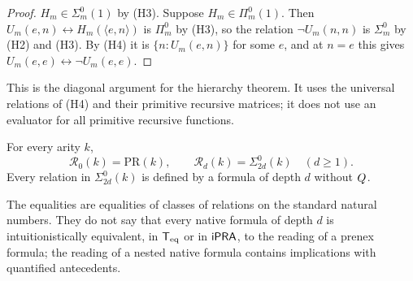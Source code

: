 \begin{proof}
$H_m\in\Sigma^0_m(1)$ by (H3).  Suppose $H_m\in\Pi^0_m(1)$.  Then
$U_m(e,n)\leftrightarrow H_m(\langle e,n\rangle)$ is $\Pi^0_m$ by (H3), so
the relation $\neg U_m(n,n)$ is $\Sigma^0_m$ by (H2) and (H3).  By (H4) it
is $\{n:U_m(e,n)\}$ for some $e$, and at $n=e$ this gives
$U_m(e,e)\leftrightarrow\neg U_m(e,e)$.
\end{proof}

This is the diagonal argument for the hierarchy theorem.  It uses the
universal relations of (H4) and their primitive recursive matrices; it does
not use an evaluator for all primitive recursive functions.

\begin{theorem}
\label{kern:thm:depth}
For every arity $k$,
\[
 \mathcal R_0(k)=\mathrm{PR}(k),\qquad
 \mathcal R_d(k)=\Sigma^0_{2d}(k)\quad(d\ge1).
\]
Every relation in $\Sigma^0_{2d}(k)$ is defined by a formula of depth $d$
without $Q_{}$.
\end{theorem}

The equalities are equalities of classes of relations on the standard
natural numbers.  They do not say that every native formula of depth $d$ is
intuitionistically equivalent, in $\mathsf{T}_{\mathrm{eq}}$ or in $\mathsf{iPRA}$, to the reading of a
prenex formula; the reading of a nested native formula contains
implications with quantified antecedents.

